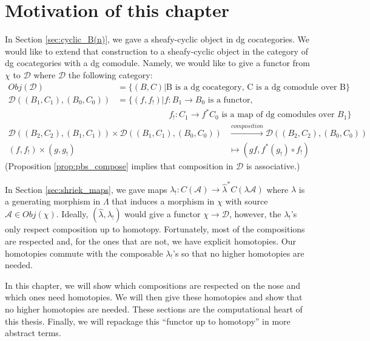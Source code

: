 \section{Motivation of this chapter}
In Section \ref{sec:cyclic_B(n)}, we gave a 
sheafy-cyclic object in dg cocategories. 
We would like to extend that construction 
to a sheafy-cyclic object in the 
category of dg cocategories with a dg 
comodule. Namely, we would like to give 
a functor from $\chi$ to $\mathcal{D}$ 
where $\mathcal{D}$ the following 
category:
\begin{align*}
Obj(\mathcal{D}) 
&= 
\{(B,C) |
  \textrm{B is a dg cocategory, 
  C is a dg comodule over B}\} \\
\mathcal{D}((B_1, C_1), (B_0, C_0))  
&= 
\{(f, f_!) | f:B_1 \to B_0 
  \textrm{ is a functor,}\\
& \phantom{{}=[(f, f_!)]{}}  
  f_!:C_1 \to f^*C_0 
  \textrm{ is a map of dg comodules over }
  B_1\}
\end{align*}
\begin{align*}  
\mathcal{D}((B_2, C_2), (B_1, C_1)) \times  
\mathcal{D}((B_1, C_1), (B_0, C_0))
&\xrightarrow{composition}
\mathcal{D}((B_2, C_2), (B_0, C_0))\\
(f,f_!) \times (g, g_!)
&\mapsto
(gf, f^*(g_!)\circ f_!)
\end{align*}
(Proposition \ref{prop:pbs_compose} implies 
that composition in $\mathcal{D}$ is 
associative.)

In Section \ref{sec:shriek_maps}, we 
gave maps $\lambda_!: C(\mathcal{A}) 
\to \hat{\lambda}^*C(\lambda \mathcal{A})$ 
where $\lambda$ is a generating 
morphism in $\Lambda$ that induces a 
morphism in $\chi$ with source $\mathcal{A} 
\in Obj(\chi)$. Ideally,  
$(\hat{\lambda}, \lambda_!)$ would give a functor 
$\chi \to \mathcal{D}$, however, 
the $\lambda_!$'s only respect 
composition up to homotopy. Fortunately, 
most of the compositions are respected 
and, for the ones that are not, we 
have explicit homotopies. Our homotopies 
commute with the composable 
$\lambda_!$'s so that no higher homotopies 
are needed.

In this chapter, we will show which compositions 
are respected on the nose and which ones 
need homotopies. We will then give these homotopies 
and show that no higher homotopies are 
needed. These sections are the computational 
heart of this thesis. Finally, we will 
repackage this ``functor up to homotopy'' 
in more abstract terms.